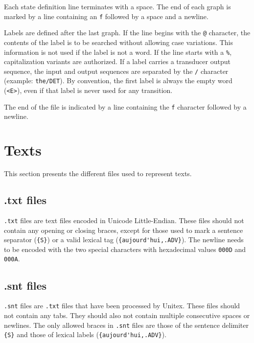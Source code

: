 \bigskip
\noindent Each state definition line terminates with a space. The end of each
graph is marked by a line containing an \verb+f+ followed by a space and a
newline.

\bigskip
\noindent Labels are defined after the last graph. If the line begins with the
\verb+@+ character, the contents of the label is to be searched without allowing
case variations. This information is not used if the label is not a word. If the
line starts with a \verb+%+, capitalization variants are authorized. If a label
carries a transducer output sequence, the input and output sequences are
separated by the \verb+/+  character (example: \verb+the/DET+). By convention,
the first label is always the empty word (\verb+<E>+), even if that label is
never used for any transition.

\bigskip
\noindent The end of the file is indicated by a line containing the \verb+f+
character followed by a newline.



\section{Texts}
This section presents the different files used to represent texts.
\subsection{.txt files}
\verb+.txt+ files are text files encoded in Unicode Little-Endian. These files
should not contain any opening or closing braces, except for those used to mark a
sentence separator (\verb+{S}+) or a valid lexical tag
(\verb+{aujourd'hui,.ADV}+). The newline needs to be encoded with the two special
characters with hexadecimal values \verb+000D+ and \verb+000A+.


\subsection{.snt files}
\verb+.snt+ files are \verb+.txt+ files that have been processed by Unitex. These
files should not contain any tabs. They should also not contain multiple
consecutive spaces or newlines. The only allowed braces in \verb+.snt+ files are
those of the sentence delimiter \verb+{S}+ and those of lexical labels
(\verb+{aujourd'hui,.ADV}+).



